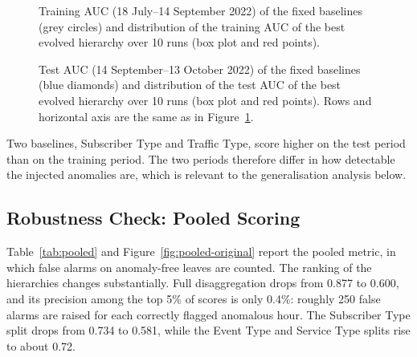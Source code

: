 \begin{figure}[htbp]
    \centering
    \caption[Training AUC of evolved hierarchies and fixed baselines]{Training \ac{AUC} (18 July--14 September 2022) of the fixed baselines (grey circles) and distribution of the training \ac{AUC} of the best evolved hierarchy over 10 runs (box plot and red points).}
    \label{fig:auc-baselines-train}
\end{figure}

\begin{figure}[htbp]
    \centering
    \caption[Test AUC of evolved hierarchies and fixed baselines]{Test \ac{AUC} (14 September--13 October 2022) of the fixed baselines (blue diamonds) and distribution of the test \ac{AUC} of the best evolved hierarchy over 10 runs (box plot and red points). Rows and horizontal axis are the same as in Figure~\ref{fig:auc-baselines-train}.}
    \label{fig:auc-baselines-test}
\end{figure}

Two baselines, Subscriber Type and Traffic Type, score higher on the test period than on the training period.
The two periods therefore differ in how detectable the injected anomalies are, which is relevant to the generalisation analysis below.

\subsection{Robustness Check: Pooled Scoring}

Table~\ref{tab:pooled} and Figure~\ref{fig:pooled-original} report the pooled metric, in which false alarms on anomaly-free leaves are counted.
The ranking of the hierarchies changes substantially.
Full disaggregation drops from 0.877 to 0.600, and its precision among the top 5\% of scores is only 0.4\%: roughly 250 false alarms are raised for each correctly flagged anomalous hour.
The Subscriber Type split drops from 0.734 to 0.581, while the Event Type and Service Type splits rise to about 0.72.

